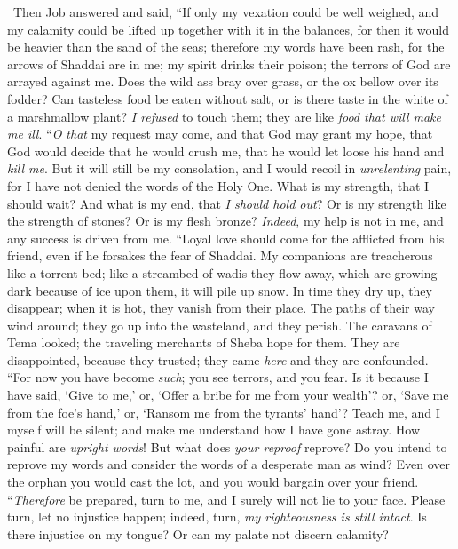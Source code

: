 \begin{biblechapter} %
  Then Job answered and said,
\verse “If only my vexation could be well weighed, 
and my calamity could be lifted up together with it in the balances,
\verse for then it would be heavier than the sand of the seas; 
therefore my words have been rash,
\verse for the arrows of Shaddai are in me; 
my spirit drinks their poison; 
the terrors of God are arrayed against me.
\verse Does the wild ass bray over grass, 
or the ox bellow over its fodder?
\verse Can tasteless food be eaten without salt, 
or is there taste in the white of a marshmallow plant?
\verse \textit{I refused} to touch them; 
they are like \textit{food that will make me ill}.
\verse “\textit{O that} my request may come, 
and that God may grant my hope,
\verse that God would decide that he would crush me, 
that he would let loose his hand and \textit{kill me}.
\verse But it will still be my consolation, 
and I would recoil in \textit{unrelenting} pain, 
for I have not denied the words of the Holy One.
\verse What is my strength, that I should wait? 
And what is my end, that \textit{I should hold out}?
\verse Or is my strength like the strength of stones? 
Or is my flesh bronze?
\verse \textit{Indeed}, my help is not in me, 
and any success is driven from me.
\verse “Loyal love should come for the afflicted from his friend, 
even if he forsakes the fear of Shaddai.
\verse My companions are treacherous like a torrent-bed; 
like a streambed of wadis they flow away,
\verse which are growing dark because of ice upon them, 
it will pile up snow.
\verse In time they dry up, they disappear; 
when it is hot, they vanish from their place.
\verse The paths of their way wind around; 
they go up into the wasteland, and they perish.
\verse The caravans of Tema looked; 
the traveling merchants of Sheba hope for them.
\verse They are disappointed, because they trusted; 
they came \textit{here} and they are confounded.
\verse “For now you have become \textit{such}; 
you see terrors, and you fear.
\verse Is it because I have said, ‘Give to me,’ 
or, ‘Offer a bribe for me from your wealth’?
\verse or, ‘Save me from the foe’s hand,’ 
or, ‘Ransom me from the tyrants’ hand’?
\verse Teach me, and I myself will be silent; 
and make me understand how I have gone astray.
\verse How painful are \textit{upright words}! 
But what does \textit{your reproof} reprove?
\verse Do you intend to reprove my words 
and consider the words of a desperate man as wind?
\verse Even over the orphan you would cast the lot, 
and you would bargain over your friend.
\verse “\textit{Therefore} be prepared, turn to me, 
and I surely will not lie to your face.
\verse Please turn, let no injustice happen; 
indeed, turn, \textit{my righteousness is still intact}.
\verse Is there injustice on my tongue? 
Or can my palate not discern calamity?
\end{biblechapter}


